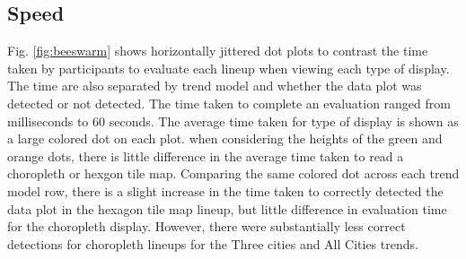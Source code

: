 \documentclass[conference,final,]{IEEEtran}
\begin{document}
\hypertarget{speed}{%
\subsection{Speed}\label{speed}}

Fig. \ref{fig:beeswarm} shows horizontally jittered dot plots to contrast the time taken by participants to evaluate each lineup when viewing each type of display. The time are also separated by trend model and whether the data plot was detected or not detected. The time taken to complete an evaluation ranged from milliseconds to 60 seconds. The average time taken for type of display is shown as a large colored dot on each plot. when considering the heights of the green and orange dots, there is little difference in the average time taken to read a choropleth or hexgon tile map. Comparing the same colored dot across each trend model row, there is a slight increase in the time taken to correctly detected the data plot in the hexagon tile map lineup, but little difference in evaluation time for the choropleth display. However, there were substantially less correct detections for choropleth lineups for the Three cities and All Cities trends.
\end{document}
